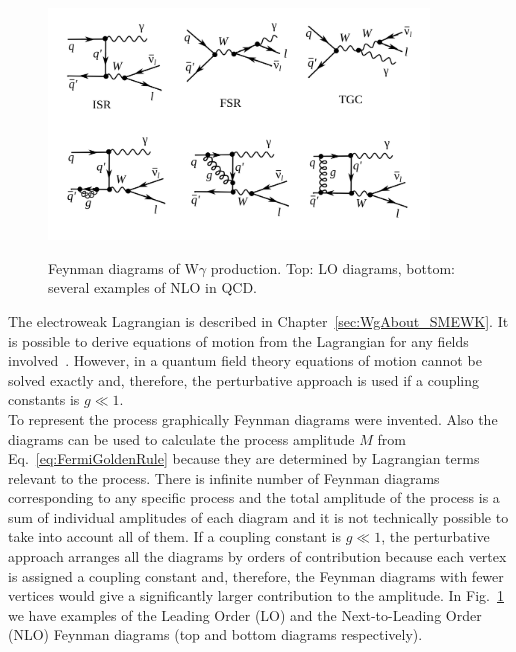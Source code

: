 \begin{figure}[htb]
  \begin{center}
    {\includegraphics[width=0.90\textwidth]{../figs/WgAbout/feynmWg_LO_NLO.png}}
    \caption{Feynman diagrams of W$\gamma$ production. Top: LO diagrams, bottom: several examples of NLO in QCD.}
    \label{fig:feynmWg_LO_NLO}
  \end{center}
\end{figure}

The electroweak Lagrangian is described in Chapter~\ref{sec:WgAbout_SMEWK}. It is possible to derive equations of motion from the Lagrangian for any fields involved~\cite{ref_Griffiths}. However, in a quantum field theory equations of motion cannot be solved exactly and, therefore, the perturbative approach is used if a coupling constants is $g \ll 1$.\\

To represent the process graphically Feynman diagrams were invented. Also the diagrams can be used to calculate the process amplitude $M$ from Eq.~\ref{eq:FermiGoldenRule} because they are determined by Lagrangian terms relevant to the process. There is infinite number of Feynman diagrams corresponding to any specific process and the total amplitude of the process is a sum of individual amplitudes of each diagram and it is not technically possible to take into account all of them. If a coupling constant is $g \ll 1$, the perturbative approach arranges all the diagrams by orders of contribution because each vertex is assigned a coupling constant and, therefore, the Feynman diagrams with fewer vertices would give a significantly larger contribution to the amplitude. In Fig.~\ref{fig:feynmWg_LO_NLO} we have examples of the Leading Order (LO) and the Next-to-Leading Order (NLO) Feynman diagrams (top and bottom diagrams respectively).\\

